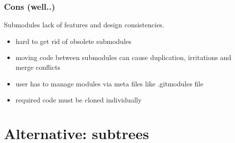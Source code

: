 \documentclass[10pt]{beamer}
\begin{document}
\begin{frame}
	\frametitle{Cons (well..)}
	Submodules lack of features and design consistencies.
	\begin{itemize}
		\item hard to get rid of obsolete submodules
		\item moving code between submodules can cause duplication, irritations and merge conflicts
		\item user has to manage modules via meta files like .gitmodules file
		\item required code must be cloned individually
	\end{itemize}
\end{frame}
   
\section{Alternative: subtrees}
\end{document}
